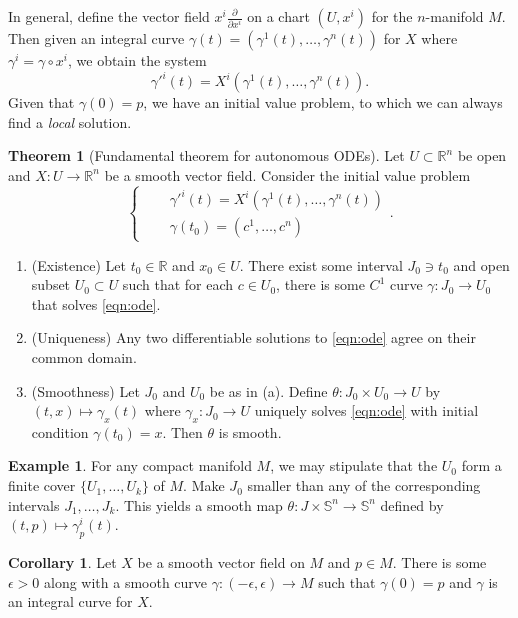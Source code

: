 \documentclass[10pt,letterpaper,cm]{nupset}
\theoremstyle{definition}
\newtheorem{exmp}[definition]{Example}
\theoremstyle{theorem}
\newtheorem{theorem}[definition]{Theorem}
\newtheorem{corollary}[definition]{Corollary}
\theoremstyle{remark}
\newcommand{\R}{\mathbb R}
\renewcommand{\S}{\mathbb S}
\newcommand{\1}{\mathbf{1}}
\newcommand{\0}{\vec 0}
\begin{document}
\medskip


In general, define the vector field $x^i\frac{\partial}{\partial{x^i}}$ on a chart $(U, x^i)$ for the $n$-manifold $M$. Then given an integral curve $\gamma(t) = \left(\gamma^1(t), \ldots, \gamma^n(t)\right)$ for $X$ where $\gamma^i = \gamma \circ x^i$, we obtain the system $$ \gamma'^i(t) = X^i\left(\gamma^1(t), \ldots, \gamma^n(t)\right).  $$ Given that $\gamma(0) =p$, we have an initial value problem, to which we can always find a \emph{local} solution.

\smallskip

\begin{theorem}[Fundamental theorem for autonomous ODEs]
Let $U\subset \R^n$ be open and $X: U \to \R^n$ be a smooth vector field.  Consider the initial value problem
\begin{equation}
 \begin{cases}  \label{eqn:ode} 
 & \gamma'^i(t)  = X^i\left(\gamma^1(t), \ldots, \gamma^n(t)\right) \\ \quad  & \gamma(t_0)  =(c^1, \ldots, c^n) 
 \end{cases}.
\end{equation}
\begin{enumerate}[label=(\alph*)]
\item (Existence)  Let $t_0 \in \R$ and $x_0\in U$. There exist some interval $J_0 \ni t_0$ and open subset $U_0 \subset U$ such that for each $c\in U_0$, there is some $C^1$ curve $\gamma : J_0 \to U_0$ that solves  \cref{eqn:ode}.
\item (Uniqueness)  Any two differentiable solutions to  \cref{eqn:ode} agree on their common domain.
\item (Smoothness) Let $J_0$ and $U_0$ be as in (a). Define $\theta : J_0 \times U_0 \to U$ by $(t, x) \mapsto \gamma_x(t)$ where $\gamma_x : J_0 \to U$ uniquely solves  \cref{eqn:ode} with initial condition $\gamma(t_0) = x$. Then $\theta$ is smooth.
\end{enumerate}
\end{theorem}

\begin{exmp}
For any compact manifold $M$, we may stipulate that the $U_0$ form a finite cover $\{U_1, \ldots, U_k\}$ of $M$. Make $J_0$ smaller than any of the corresponding intervals $J_1, \ldots, J_k$. This yields a smooth map $\theta : J \times \S^n \to \S^n$ defined by $(t, p) \mapsto \gamma_p^i(t)$.
\end{exmp}

\begin{corollary}
Let $X$ be a smooth vector field on $M$ and $p\in M$. There is some $\epsilon >0$ along with a smooth curve $\gamma : ({-\epsilon} , \epsilon) \to M$ such that $\gamma(0)= p$ and $\gamma$ is an integral curve for $X$.
\end{corollary}
\end{document}
